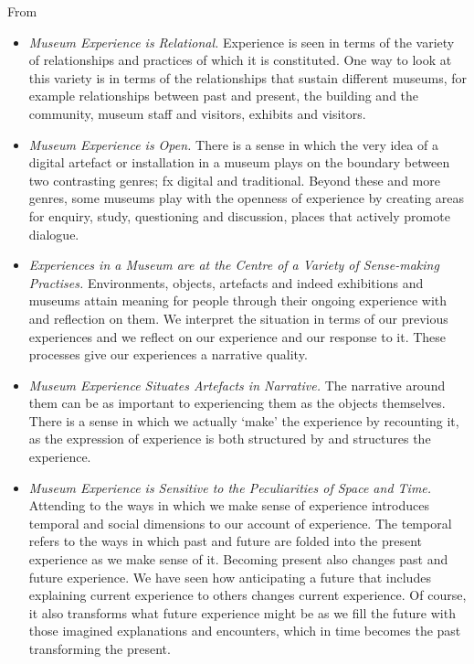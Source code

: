 From \autocite[]{}
\begin{itemize}
    \item \emph{Museum Experience is Relational.} Experience is seen in terms of the variety of relationships and practices of which it is constituted. One way to look at this variety is in terms of the relationships that sustain different museums, for example relationships between past and present, the building and the community, museum staff and visitors, exhibits and visitors. 
    
    \item \emph{Museum Experience is Open.} There is a sense in which the very idea of a digital artefact or installation in a museum plays on the boundary between two contrasting genres; fx digital and traditional. Beyond these and more genres, some museums play with the openness of experience by creating areas for enquiry, study, questioning and discussion, places that actively promote dialogue.

    \item \emph{Experiences in a Museum are at the Centre of a Variety of Sense-making Practises.} Environments, objects, artefacts and indeed exhibitions and museums attain meaning for people through their ongoing experience with and reflection on them. We interpret the situation in terms of our previous experiences and we reflect on our experience and our response to it. These processes give our experiences a narrative quality.
    
    \item \emph{Museum Experience Situates Artefacts in Narrative.} The narrative around them can be as important to experiencing them as the objects themselves. There is a sense in which we actually ‘make’ the experience by recounting it, as the expression of experience is both structured by and structures the experience. 
    
    \item \emph{Museum Experience is Sensitive to the Peculiarities of Space and Time.} Attending to the ways in which we make sense of experience introduces temporal and social dimensions to our account of experience. The temporal refers to the ways in which past and future are folded into the present experience as we make sense of it. Becoming present also changes past and future experience. We have seen how anticipating a future that includes explaining current experience to others changes current experience. Of course, it also transforms what future experience might be as we fill the future with those imagined explanations and encounters, which in time becomes the past transforming the present. 

\end{itemize}

